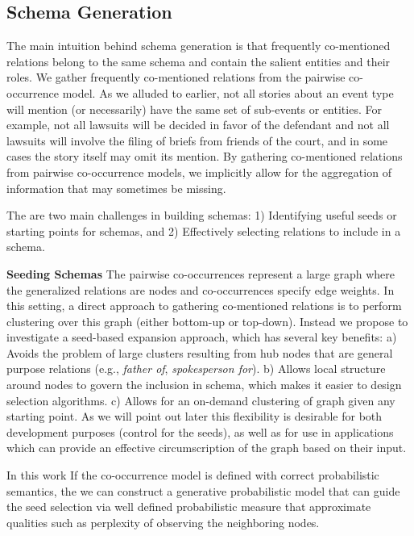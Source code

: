 \subsection{Schema Generation}

The main intuition behind schema generation is that frequently co-mentioned relations belong to the same schema and contain the salient entities and their roles. We gather frequently co-mentioned relations from the pairwise co-occurrence model. As we alluded to earlier, not all stories about an event type will mention (or necessarily) have the same set of sub-events or entities. For example, not all lawsuits will be decided in favor of the defendant and not all lawsuits will involve the filing of briefs from friends of the court, and in some cases the story itself may omit its mention. By gathering co-mentioned relations from pairwise co-occurrence models, we implicitly allow for the aggregation of information that may sometimes be missing. 

The are two main challenges in building schemas: 1) Identifying useful seeds or starting points for schemas, and 2) Effectively selecting relations to include in a schema.

\textbf{Seeding Schemas} The pairwise co-occurrences represent a large graph where the generalized relations are nodes and co-occurrences specify edge weights. In this setting, a direct approach to gathering co-mentioned relations is to perform clustering over this graph (either bottom-up or top-down). Instead we propose to investigate a seed-based expansion approach, which has several key benefits: a) Avoids the problem of large clusters resulting from hub nodes that are general purpose relations (e.g., {\em father of}, {\em spokesperson for}). b) Allows local structure around nodes to govern the inclusion in schema, which makes it easier to design selection algorithms.  c) Allows for an on-demand clustering of graph given any starting point. As we will point out later this flexibility is desirable for both development purposes (control for the seeds), as well as for use in applications which can provide an effective circumscription of the graph based on their input.

In this work 
If the co-occurrence model is defined with correct probabilistic semantics, the we can construct a generative probabilistic model that can guide the seed selection via well defined probabilistic measure that approximate qualities such as perplexity of observing the neighboring nodes. 
 

